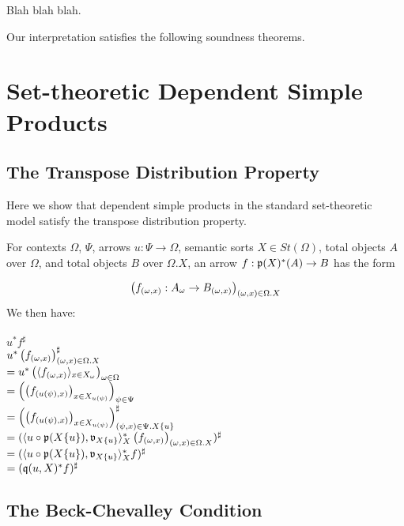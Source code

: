 \documentclass[sigplan,10pt,review,anonymous]{acmart}
\newcommand{\fm}[2]{
\left(
\tiny
#1
\normalsize
\right)_{#2}
}
\begin{document}
Blah blah blah.

Our interpretation satisfies the following soundness theorems.

 

\appendix

\onecolumn

\section{Set-theoretic Dependent Simple Products}

\subsection{The Transpose Distribution Property}

Here we show that dependent simple products in the standard set-theoretic model satisfy the transpose distribution property.

For contexts $\Omega$, $\Psi$, arrows $u : \Psi \to \Omega$, semantic sorts $X \in \mathit{St}(\Omega)$, total objects $A$ over $\Omega$, and total objects $B$ over $\Omega . X$,  
an arrow $f : \frak p(X)^*(A) \to B$ has the form

$$\fm{f_{(\omega,x)} : A_{\omega} \to B_{(\omega,x)}}{(\omega,x) \in \Omega . X}$$
We then have:\\~\\
$u^* f^\sharp$ \\
$u^* \fm{f_{(\omega,x)}}{(\omega,x) \in \Omega . X}^\sharp$ \\
$= u^* \fm{\langle f_{(\omega, x)} \rangle_{x \in X_\omega}}{\omega \in \Omega}$ \\
$= \fm{ \fm{f_{(u(\psi), x)}}{x \in X_{u(\psi)}}}{\psi \in \Psi}$\\
$= \fm{ \fm{f_{(u(\psi), x)}}{x \in X_{u(\psi)}}}{(\psi, x) \in \Psi . X \{ u \}}^\sharp$\\
$= (\langle u \circ \frak p(X \{ u \}), \frak v_{X \{ u \}} \rangle_X^* \fm{f_{(\omega,x)}}{(\omega,x) \in \Omega . X})^\sharp$\\
$= (\langle u \circ \frak p(X \{ u \}), \frak v_{X \{ u \}} \rangle_X^* f)^\sharp$\\
$= (\frak q(u,X)^* f)^\sharp$

\subsection{The Beck-Chevalley Condition}

\label{sec:beck-chevalley}
\end{document}
